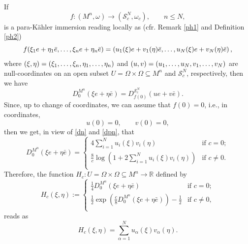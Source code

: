 \documentclass{article}
\newcommand{\R}{\mathds{R}}
\newcommand{\s}{\mathcal{S}}
\newcommand{\pk}{para-K\"ahler }
\begin{document}
\smallskip\noindent
If $$f: (M^n,\omega)\to (\s_c^N,\omega_c), \qquad n\leq N,$$
is a \pk immersion reading locally as (cfr. Remark \ref{ph1} and Definition \ref{ph2})
\begin{equation}\label{immersion}
f(\xi_1e+\eta_1\bar e,\mathellipsis,\xi_ne+\eta_n\bar e)=\left(u_1(\xi) e+v_1(\eta)\bar e,\mathellipsis, u_N(\xi)e+v_N(\eta)\bar e \right),\end{equation}
where $(\xi,\eta)=(\xi_1,\mathellipsis,\xi_n,\eta_1,\mathellipsis,\eta_n)$ and $(u,v)=(u_1,\mathellipsis,u_N,v_1,\mathellipsis,v_N)$ are null-coordinates on 
 an open subset
$U=\Omega\times\Omega\subseteq M^n$ and $\s_c^N$, respectively, then we have
$$D_0^{M^n}(\xi e+\eta \bar e)=D_{f(0)}^{\s_c^N}(ue+v\bar e).$$
Since, up to change of coordinates, we can assume that $f(0)=0$, i.e., in coordinates,
\begin{equation}\label{u0v0}
u(0)=0, \qquad v(0)=0,\end{equation} then
 we get, in view of \eqref{dn} and \eqref{dpn},    that
\begin{equation}
D_0^{M^n}(\xi e+\eta \bar e)=
\begin{cases}
4\sum_{i=1}^N u_i(\xi)v_i(\eta) &\text{if } c=0;\\
\frac{8}{c}\log\left(1+2\sum_{i=1}^N u_i(\xi)v_i(\eta)\right) &\text{if } c\neq 0.\\
\end{cases}
\end{equation}
Therefore, the function $H_c :U=\Omega\times\Omega\subseteq M^n\to \R$ defined by
\begin{equation}\label{H}
H_c(\xi,\eta):=
\begin{cases}
\frac{1}{4}D_0^{M^n}(\xi e+\eta \bar e)&\text{if } c=0;\\
\frac{1}{2}\exp\left( \frac{c}{8}D_0^{M^n}(\xi e+\eta \bar e)\right)-\frac{1}{2} &\text{if } c\neq 0,\\
\end{cases}
\end{equation}
reads as
\begin{equation}\label{problem}
H_c(\xi,\eta)=\sum_{\alpha=1}^N u_\alpha(\xi)v_\alpha(\eta).
\end{equation}
\end{document}

